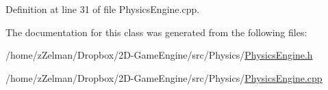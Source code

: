 Definition at line 31 of file Physics\-Engine.\-cpp.



The documentation for this class was generated from the following files\-:\begin{DoxyCompactItemize}
\item 
/home/z\-Zelman/\-Dropbox/2\-D-\/\-Game\-Engine/src/\-Physics/\hyperlink{PhysicsEngine_8h}{Physics\-Engine.\-h}\item 
/home/z\-Zelman/\-Dropbox/2\-D-\/\-Game\-Engine/src/\-Physics/\hyperlink{PhysicsEngine_8cpp}{Physics\-Engine.\-cpp}\end{DoxyCompactItemize}
